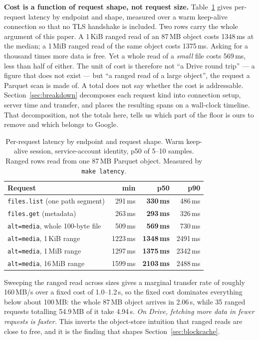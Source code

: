 \documentclass[sigconf, nonacm]{acmart}
\begin{document}
\textbf{Cost is a function of request shape, not request size.}
Table~\ref{tab:latency} gives per-request latency by endpoint and shape,
measured over a warm keep-alive connection so that no TLS handshake is
included. Two rows carry the whole argument of this paper. A 1\,KiB ranged
read of an 87\,MB object costs 1348\,ms at the median; a 1\,MiB ranged read of
the same object costs 1375\,ms. Asking for a thousand times more data is free.
Yet a whole read of a \emph{small} file costs 569\,ms, less than half of
either. The unit of cost is therefore not ``a Drive round trip'' --- a figure
that does not exist --- but ``a ranged read of a large object'', the request a
Parquet scan is made of. A total does not say whether the cost is addressable.
Section~\ref{sec:breakdown} decomposes each request kind into connection
setup, server time and transfer, and places the resulting spans on a
wall-clock timeline. That decomposition, not the totals here, tells us which
part of the floor is ours to remove and which belongs to Google.

\begin{table}[t]
\caption{Per-request latency by endpoint and request shape. Warm keep-alive
session, service-account identity, p50 of 5--10 samples. Ranged rows read
from one 87\,MB Parquet object. Measured by \texttt{make latency}.}
\label{tab:latency}
\small
\begin{tabular}{lrrr}
\toprule
Request & min & \textbf{p50} & p90 \\
\midrule
\texttt{files.list} (one path segment)      & 291\,ms  & \textbf{330\,ms}  & 486\,ms \\
\texttt{files.get} (metadata)               & 263\,ms  & \textbf{293\,ms}  & 326\,ms \\
\texttt{alt=media}, whole 100-byte file     & 509\,ms  & \textbf{569\,ms}  & 730\,ms \\
\texttt{alt=media}, 1\,KiB range            & 1223\,ms & \textbf{1348\,ms} & 2491\,ms \\
\texttt{alt=media}, 1\,MiB range            & 1297\,ms & \textbf{1375\,ms} & 2342\,ms \\
\texttt{alt=media}, 16\,MiB range           & 1599\,ms & \textbf{2103\,ms} & 2488\,ms \\
\bottomrule
\end{tabular}
\end{table}

Sweeping the ranged read across sizes gives a marginal transfer rate of
roughly 160\,MB/s over a fixed cost of 1.0--1.2\,s, so the fixed cost dominates
everything below about 100\,MB: the whole 87\,MB object arrives in 2.06\,s,
while 35 ranged requests totalling 54.9\,MB of it take 4.94\,s. \emph{On
Drive, fetching more data in fewer requests is faster.} This inverts the
object-store intuition that ranged reads are close to free, and it is the
finding that shapes Section~\ref{sec:blockcache}.
\end{document}
